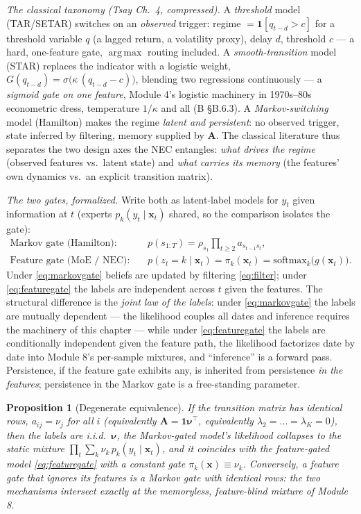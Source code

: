 \documentclass[11pt]{article}
\numberwithin{equation}{section}
\theoremstyle{plain}
\newtheorem{proposition}[theorem]{Proposition}
\theoremstyle{definition}
\theoremstyle{remark}
\DeclareMathOperator*{\argmax}{arg\,max}
\newcommand{\x}{\bm{x}}
\newcommand{\T}{\top}
\newcommand{\bA}{\bm{A}}
\newcommand{\bnu}{\bm{\nu}}
\begin{document}
\emph{The classical taxonomy (Tsay Ch.\ 4, compressed).} A \emph{threshold} model (TAR/SETAR) switches on an \emph{observed} trigger: regime $= \mathbf{1}[q_{t-d} > c]$ for a threshold variable $q$ (a lagged return, a volatility proxy), delay $d$, threshold $c$ --- a hard, one-feature gate, $\argmax$ routing included. A \emph{smooth-transition} model (STAR) replaces the indicator with a logistic weight, $G(q_{t-d}) = \sigma\big(\kappa\,(q_{t-d} - c)\big)$, blending two regressions continuously --- a \emph{sigmoid gate on one feature}, Module 4's logistic machinery in 1970s--80s econometric dress, temperature $1/\kappa$ and all (B \S B.6.3). A \emph{Markov-switching} model (Hamilton) makes the regime \emph{latent and persistent}: no observed trigger, state inferred by filtering, memory supplied by $\bA$. The classical literature thus separates the two design axes the NEC entangles: \emph{what drives the regime} (observed features vs.\ latent state) and \emph{what carries its memory} (the features' own dynamics vs.\ an explicit transition matrix).

\emph{The two gates, formalized.} Write both as latent-label models for $y_t$ given information at $t$ (experts $p_k(y_t \mid \x_t)$ shared, so the comparison isolates the gate):
\begin{align}
\text{Markov gate (Hamilton):}\qquad
& p(s_{1:T}) = \rho_{s_1} \prod_{t \ge 2} a_{s_{t-1} s_t},
\label{eq:markovgate}\\
\text{Feature gate (MoE / NEC):}\qquad
& p(z_t = k \mid \x_t) = \pi_k(\x_t) = \mathrm{softmax}_k\big(g(\x_t)\big).
\label{eq:featuregate}
\end{align}
Under \eqref{eq:markovgate} beliefs are updated by filtering \eqref{eq:filter}; under \eqref{eq:featuregate} the labels are independent across $t$ given the features. The structural difference is the \emph{joint law of the labels}: under \eqref{eq:markovgate} the labels are mutually dependent --- the likelihood couples all dates and inference requires the machinery of this chapter --- while under \eqref{eq:featuregate} the labels are conditionally independent given the feature path, the likelihood factorizes date by date into Module 8's per-sample mixtures, and ``inference'' is a forward pass. Persistence, if the feature gate exhibits any, is inherited from persistence \emph{in the features}; persistence in the Markov gate is a free-standing parameter.

\begin{proposition}[Degenerate equivalence]\label{prop:degenerate}
If the transition matrix has identical rows, $a_{ij} = \nu_j$ for all $i$ (equivalently $\bA = \bm 1 \bnu^\T$, equivalently $\lambda_2 = \dots = \lambda_K = 0$), then the labels are i.i.d.\ $\bnu$, the Markov-gated model's likelihood collapses to the static mixture $\prod_t \sum_k \nu_k\, p_k(y_t \mid \x_t)$, and it coincides with the feature-gated model \eqref{eq:featuregate} with a constant gate $\pi_k(\x) \equiv \nu_k$. Conversely, a feature gate that ignores its features is a Markov gate with identical rows: \emph{the two mechanisms intersect exactly at the memoryless, feature-blind mixture of Module 8}.
\end{proposition}
\end{document}

